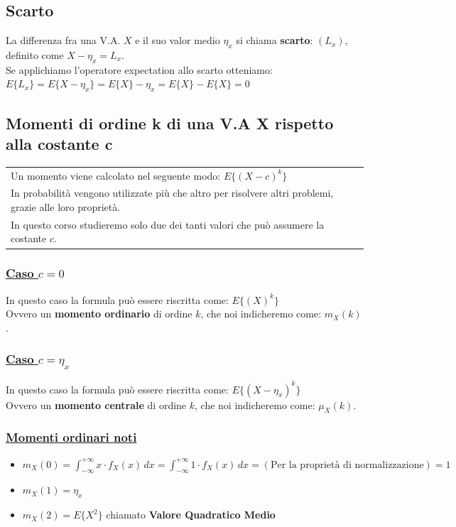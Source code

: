 \documentclass{article}
\begin{document}
\subsection{Scarto}
La differenza fra una V.A. $X$ e il suo valor medio $\eta_x$ si chiama \textbf{scarto}: $\left(L_x\right)$, definito come $X - \eta_x = L_x$. \\
Se applichiamo l’operatore expectation allo scarto otteniamo: \\ 
$E \big\{ L_x \big\} = E \big\{ X - \eta_x \big\} = E \big\{ X\big\} - \eta_x = E \big\{ X \big\} - E \big\{ X \big\} = 0$

\subsection{Momenti di ordine k di una V.A X rispetto alla costante c}
\begin{tabular}{|p{13cm}}
Un momento viene calcolato nel seguente modo: $E \big\{(X-c)^k\big\}$ \\
In probabilità vengono utilizzate più che altro per risolvere altri problemi, grazie alle loro proprietà. \\
In questo corso studieremo solo due dei tanti valori che può assumere la costante $c$.
\end{tabular}
\subsubsection{\underline{Caso $c = 0$}}
In questo caso la formula può essere riscritta come: $E \big\{(X)^k\big\}$ \\
Ovvero un \textbf{momento ordinario} di ordine $k$, che noi indicheremo come: $m_X(k)$.
\subsubsection{\underline{Caso $c = \eta_x$}}
In questo caso la formula può essere riscritta come: $E \big\{(X-\eta_x)^k\big\}$ \\
Ovvero un \textbf{momento centrale} di ordine $k$, che noi indicheremo come: $\mu_X(k)$.
\subsubsection{\underline{Momenti ordinari noti}}
\begin{itemize}
    \item $m_X(0) = \int_{-\infty}^{+\infty}x \cdot f_X(x) \,dx = \int_{-\infty}^{+\infty}1 \cdot f_X(x) \,dx = \left( \text{Per la proprietà di normalizzazione} \right) = 1$
    \item $m_X(1) = \eta_x$
    \item $m_X(2) = E\big\{ X^2\big\}$ chiamato \textbf{Valore Quadratico Medio}
\end{itemize}
\end{document}
